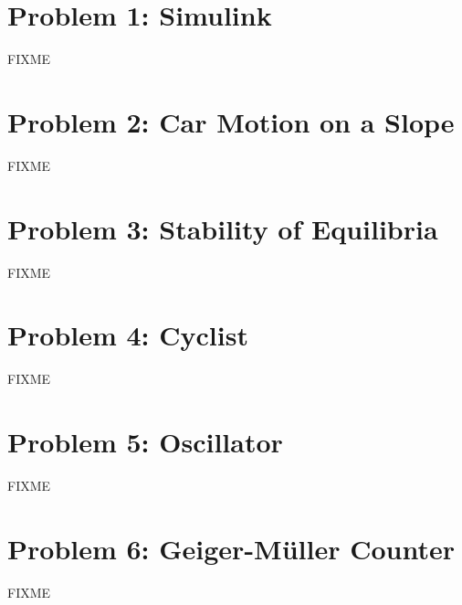 \documentclass[a4paper,parskip,headheight=38pt]{scrartcl} %
\begin{document}
\section*{Problem 1: Simulink}

FIXME


\section*{Problem 2: Car Motion on a Slope}

FIXME


\section*{Problem 3: Stability of Equilibria}

FIXME


\section*{Problem 4: Cyclist}

FIXME


\section*{Problem 5: Oscillator}

FIXME


\section*{Problem 6: Geiger-Müller Counter}

FIXME
\end{document}
